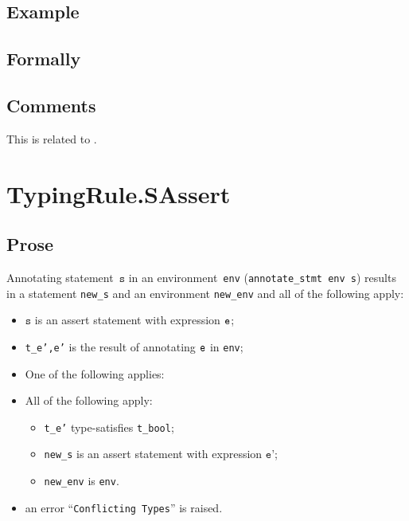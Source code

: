 \documentclass{book}
\newcommand\vs[0]{\texttt{s}}
\newcommand\vep[0]{\texttt{e'}}
\begin{document}
\begin{itemize}
  \subsection{Example}



\begin{emptyformal}
    \subsection{Formally}
\end{emptyformal}

\subsection{Comments}
    This is related to .

\section{TypingRule.SAssert \label{sec:TypingRule.SAssert}}

  \subsection{Prose}
Annotating statement~$\vs$ in an environment~\texttt{env}
(\texttt{annotate\_stmt env s}) results in a statement \texttt{new\_s} and an
environment \texttt{new\_env} and all of the following apply:
   \begin{itemize}
   \item $\vs$ is an assert statement with expression $\texttt{e}$;
   \item \texttt{t\_e',e'} is the result of annotating $\texttt{e}$ in \texttt{env};
   \item One of the following applies:
     \item All of the following apply:
       \begin{itemize}
       \item \texttt{t\_e'} type-satisfies \texttt{t\_bool};
       \item \texttt{new\_s} is an assert statement with expression $\vep$;
       \item \texttt{new\_env} is \texttt{env}.
       \end{itemize}
     \item an error ``\texttt{Conflicting Types}'' is raised.
   \end{itemize}


\end{itemize}
\end{document}
